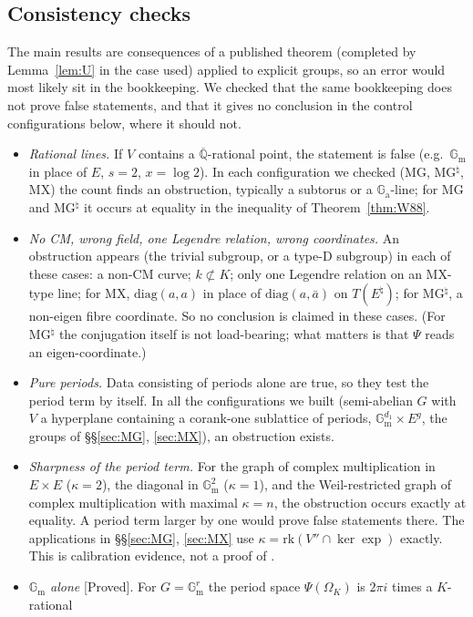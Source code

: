 \documentclass[11pt]{amsart}
\theoremstyle{definition}
\newcommand{\Qb}{\overline{\mathbb{Q}}}
\newcommand{\Ga}{\mathbb{G}_{\mathrm a}}
\newcommand{\Gm}{\mathbb{G}_{\mathrm m}}
\newcommand{\lab}[1]{\textup{[#1]}}
\begin{document}
\subsection{Consistency checks}\label{sec:checks}
The main results are consequences of a published theorem (completed by Lemma~\ref{lem:U} in the case used) applied to
explicit groups, so an error would most likely sit in the bookkeeping. We checked that the same bookkeeping does not
prove false statements, and that it gives no conclusion in the control configurations below, where it should not.
\begin{itemize}
\item \emph{Rational lines.} If $V$ contains a $\Qb$-rational point, the statement is false (e.g.\ $\Gm$ in place of $E$,
$s=2$, $x=\log2$). In each configuration we checked (MG, MG$^\natural$, MX) the count finds an obstruction, typically a
subtorus or a $\Ga$-line; for MG and MG$^\natural$ it occurs at equality in the inequality of Theorem~\ref{thm:W88}.
\item \emph{No CM, wrong field, one Legendre relation, wrong coordinates.} An obstruction appears (the trivial subgroup,
or a type-D subgroup) in each of these cases: a non-CM curve; $k\not\subset K$; only one Legendre relation on an MX-type
line; for MX, $\mathrm{diag}(a,a)$ in place of $\mathrm{diag}(a,\bar a)$ on $T(E^\natural)$; for MG$^\natural$, a non-eigen fibre
coordinate. So no conclusion is claimed in these cases. (For MG$^\natural$ the conjugation itself is not load-bearing;
what matters is that $\Psi$ reads an eigen-coordinate.)
\item \emph{Pure periods.} Data consisting of periods alone are true, so they test the period term by itself. In all the
configurations we built (semi-abelian $G$ with $V$ a hyperplane containing a corank-one sublattice of periods,
$\Gm^{d_1}\times E^g$, the groups of \S\S\ref{sec:MG}, \ref{sec:MX}), an obstruction exists.
\item \emph{Sharpness of the period term.} For the graph of complex multiplication in $E\times E$ ($\kappa=2$), the
diagonal in $\Gm^2$ ($\kappa=1$), and the Weil-restricted graph of complex multiplication with maximal $\kappa=n$, the
obstruction occurs exactly at equality. A period term larger by one would prove false statements there. The
applications in \S\S\ref{sec:MG}, \ref{sec:MX} use $\kappa=\mathrm{rk}(V''\cap\ker\exp)$ exactly. This is calibration evidence,
not a proof of \cite[Prop.~6.1]{W88}.
\item \emph{$\Gm$ alone} \lab{Proved}. For $G=\Gm^r$ the period space $\Psi(\Omega_K)$ is $2\pi i$ times a $K$-rational

\end{itemize}
\end{document}
